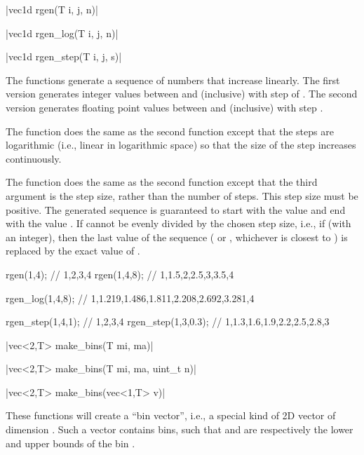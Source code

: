 \funcitem \cppinline|vec1d rgen(T i, j, n)|

\cppinline|vec1d rgen_log(T i, j, n)| 

\cppinline|vec1d rgen_step(T i, j, s)| 

The  functions generate a sequence of numbers that increase linearly. The first version generates integer values between  and  (inclusive) with step of . The second version generates  floating point values between  and  (inclusive) with step .

The  function does the same as the second  function except that the steps are logarithmic (i.e., linear in logarithmic space) so that the size of the step increases continuously.

The  function does the same as the second  function except that the third argument is the step size, rather than the number of steps. This step size must be positive. The generated sequence is guaranteed to start with the value  and end with the value . If  cannot be evenly divided by the chosen step size, i.e., if  (with  an integer), then the last value of the sequence ( or , whichever is closest to ) is replaced by the exact value of .

\begin{example}
\begin{cppcode}
rgen(1,4); // {1,2,3,4}
rgen(1,4,8); // {1,1.5,2,2.5,3,3.5,4}

rgen_log(1,4,8); // {1,1.219,1.486,1.811,2.208,2.692,3.281,4}

rgen_step(1,4,1); // {1,2,3,4}
rgen_step(1,3,0.3); // {1,1.3,1.6,1.9,2.2,2.5,2.8,3}
\end{cppcode}
\end{example}

\funcitem \cppinline|vec<2,T> make_bins(T mi, ma)| 

\cppinline|vec<2,T> make_bins(T mi, ma, uint_t n)|

\cppinline|vec<2,T> make_bins(vec<1,T> v)|

These functions will create a ``bin vector'', i.e., a special kind of 2D vector of dimension \cppinline{[2,n]}. Such a vector contains  bins, such that  and  are respectively the lower and upper bounds of the bin .

